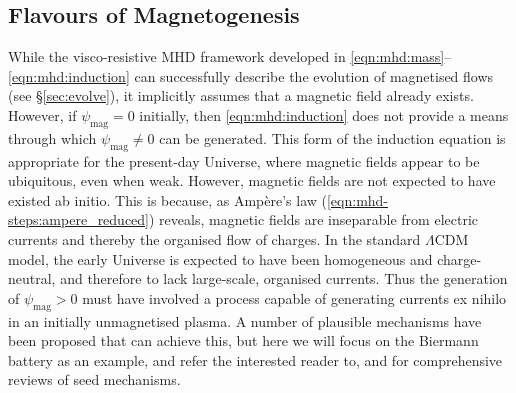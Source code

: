 \subsection{Flavours of Magnetogenesis}
\label{sec:modelling:magnetogenesis}

While the visco-resistive MHD framework developed in \autoref{eqn:mhd:mass}--\ref{eqn:mhd:induction} can successfully describe the evolution of magnetised flows (see \S\ref{sec:evolve}), it implicitly assumes that a magnetic field already exists. However, if $\psi_\mathrm{mag} = 0$ initially, then \autoref{eqn:mhd:induction} does not provide a means through which $\psi_\mathrm{mag} \neq 0$ can be generated. This form of the induction equation is appropriate for the present-day Universe, where magnetic fields appear to be ubiquitous, even when weak. However, magnetic fields are not expected to have existed ab initio. This is because, as Amp\`ere's law (\autoref{eqn:mhd-steps:ampere_reduced}) reveals, magnetic fields are inseparable from electric currents and thereby the organised flow of charges. In the standard $\Lambda$CDM model, the early Universe is expected to have been homogeneous and charge-neutral, and therefore to lack large-scale, organised currents. Thus the generation of $\psi_\mathrm{mag} > 0$ must have involved a process capable of generating currents ex nihilo in an initially unmagnetised plasma. A number of plausible mechanisms have been proposed that can achieve this, but here we will focus on the Biermann battery \citep{biermann1950ursprung} as an example, and refer the interested reader to, \eg \citet{widrow2012first} and \citet{subramanian2016origin} for comprehensive reviews of seed mechanisms.


